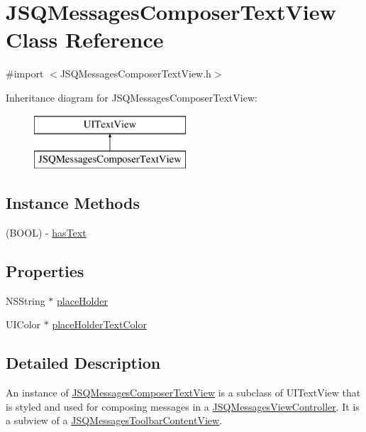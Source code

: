\hypertarget{interface_j_s_q_messages_composer_text_view}{}\section{J\+S\+Q\+Messages\+Composer\+Text\+View Class Reference}
\label{interface_j_s_q_messages_composer_text_view}


{\ttfamily \#import $<$J\+S\+Q\+Messages\+Composer\+Text\+View.\+h$>$}

Inheritance diagram for J\+S\+Q\+Messages\+Composer\+Text\+View\+:\begin{figure}[H]
\begin{center}
\leavevmode
\includegraphics[height=2.000000cm]{interface_j_s_q_messages_composer_text_view}
\end{center}
\end{figure}
\subsection*{Instance Methods}
\begin{DoxyCompactItemize}
\item 
(B\+O\+O\+L) -\/ \hyperlink{interface_j_s_q_messages_composer_text_view_a0609a48eafd52542cf1892395083e5b3}{has\+Text}
\end{DoxyCompactItemize}
\subsection*{Properties}
\begin{DoxyCompactItemize}
\item 
N\+S\+String $\ast$ \hyperlink{interface_j_s_q_messages_composer_text_view_ad5e78b1d6fe59be31f16604382a2853a}{place\+Holder}
\item 
U\+I\+Color $\ast$ \hyperlink{interface_j_s_q_messages_composer_text_view_a63dabb1df78dbe16a7a1dc4e5cea1028}{place\+Holder\+Text\+Color}
\end{DoxyCompactItemize}


\subsection{Detailed Description}
An instance of {\ttfamily \hyperlink{interface_j_s_q_messages_composer_text_view}{J\+S\+Q\+Messages\+Composer\+Text\+View}} is a subclass of {\ttfamily U\+I\+Text\+View} that is styled and used for composing messages in a {\ttfamily \hyperlink{interface_j_s_q_messages_view_controller}{J\+S\+Q\+Messages\+View\+Controller}}. It is a subview of a {\ttfamily \hyperlink{interface_j_s_q_messages_toolbar_content_view}{J\+S\+Q\+Messages\+Toolbar\+Content\+View}}. 


